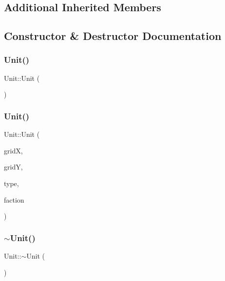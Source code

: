 \subsection*{Additional Inherited Members}


\subsection{Constructor \& Destructor Documentation}
\mbox{\label{class_unit_a8e46f663a95736c8002d85ab271a7581}} 
\subsubsection{\texorpdfstring{Unit()}{Unit()}\hspace{0.1cm}{\footnotesize\ttfamily [1/2]}}
{\footnotesize\ttfamily Unit\+::\+Unit (\begin{DoxyParamCaption}{ }\end{DoxyParamCaption})}

\mbox{\label{class_unit_ad2a3ea366d4ed09f0ea30551f5613bb9}} 
\subsubsection{\texorpdfstring{Unit()}{Unit()}\hspace{0.1cm}{\footnotesize\ttfamily [2/2]}}
{\footnotesize\ttfamily Unit\+::\+Unit (\begin{DoxyParamCaption}\item[{uint16\+\_\+t}]{gridX,  }\item[{uint16\+\_\+t}]{gridY,  }\item[{\hyperlink{class_unit_type}{Unit\+Type} $\ast$}]{type,  }\item[{\hyperlink{class_faction}{Faction} $\ast$}]{faction }\end{DoxyParamCaption})}

\mbox{\label{class_unit_a6353fc4c0a329997ad4abcf0dcb4eb27}} 
\subsubsection{\texorpdfstring{$\sim$\+Unit()}{~Unit()}}
{\footnotesize\ttfamily Unit\+::$\sim$\+Unit (\begin{DoxyParamCaption}{ }\end{DoxyParamCaption})\hspace{0.3cm}{\ttfamily [virtual]}}



